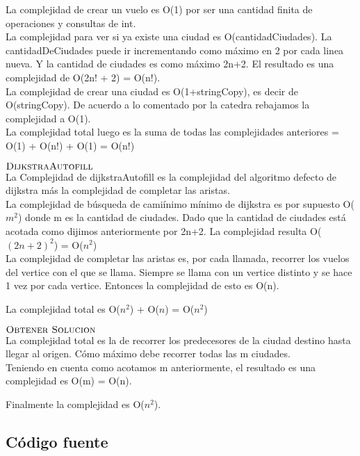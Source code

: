 \noindent
La complejidad de crear un vuelo es O(1) por ser una cantidad finita de operaciones y consultas de int.\\
La complejidad para ver si ya existe una ciudad es O(cantidadCiudades). La cantidadDeCiudades puede ir incrementando como m\'aximo en 2 por cada linea nueva. Y la cantidad de ciudades es como m\'aximo 2n+2.
El resultado es una complejidad de O(2n! + 2) = O(n!). \\
La complejidad de crear una ciudad es O(1+stringCopy), es decir de O(stringCopy). De acuerdo a lo comentado por la catedra rebajamos la complejidad a O(1).\\
La complejidad total luego es la suma de todas las complejidades anteriores = O(1) + O(n!) + O(1) = O(n!)
\bigskip

\noindent
$\textnormal{\scshape DijkstraAutofill}$ \\

\noindent
La Complejidad de dijkstraAutofill es la complejidad del algoritmo defecto de dijkstra m\'as la complejidad de completar las aristas. \\

\noindent
La complejidad de b\'usqueda de cami\'inimo m\'inimo de dijkstra es por supuesto O($m^2$) donde m es la cantidad de ciudades. Dado que la cantidad de ciudades est\'a acotada como dijimos anteriormente por 2n+2. La complejidad resulta O($(2n+2)^2$) = O($n^2$) \\

\noindent
La complejidad de completar las aristas es, por cada llamada, recorrer los vuelos del vertice con el que se llama. Siempre se llama con un vertice distinto y se hace 1 vez por cada vertice. Entonces la complejidad de esto es O(n).

\noindent
La complejidad total es O($n^2$) +  O($n$) =  O($n^2$)
\bigskip

\noindent
$\textnormal{\scshape Obtener Solucion}$ \\

\noindent
La complejidad total es la de recorrer los predecesores de la ciudad destino hasta llegar al origen. C\'omo m\'aximo debe recorrer todas las m ciudades.  \\
Teniendo en cuenta como acotamos m anteriormente, el resultado es una complejidad es O(m) = O(n). 
\bigskip

\noindent
Finalmente la complejidad es O($n^2$). 



\subsection{C\'odigo fuente}

